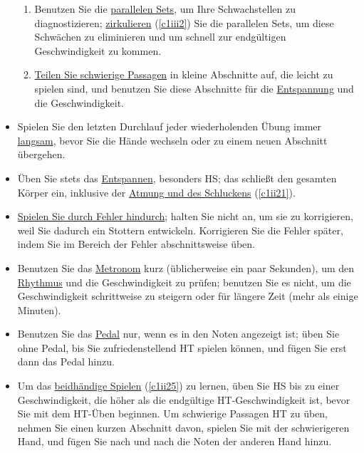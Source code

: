 \begin{itemize}
\begin{enumerate}[label={\alph*.}]
 \item Benutzen Sie die \hyperref[c1ii11]{parallelen Sets}, um Ihre Schwachstellen zu diagnostizieren; \hyperref[c1iii2]{zirkulieren} (\autoref{c1iii2}) Sie die parallelen Sets, um diese Schwächen zu eliminieren und um schnell zur endgültigen Geschwindigkeit zu kommen.
 
 \item \hyperref[c1ii6]{Teilen Sie schwierige Passagen} in kleine Abschnitte auf, die leicht zu spielen sind, und benutzen Sie diese Abschnitte für die \hyperref[c1ii14]{Entspannung} und die Geschwindigkeit.
 \end{enumerate}

\item Spielen Sie den letzten Durchlauf jeder wiederholenden Übung immer \hyperref[c1ii17]{langsam}, bevor Sie die Hände wechseln oder zu einem neuen Abschnitt übergehen.

\item Üben Sie stets das \hyperref[c1ii14]{Entspannen}, besonders HS; das schließt den gesamten Körper ein, inklusive der \hyperref[c1ii21]{Atmung und des Schluckens} (\autoref{c1ii21}).

\item \hyperref[c1ii22]{Spielen Sie durch Fehler hindurch}; halten Sie nicht an, um sie zu korrigieren, weil Sie dadurch ein Stottern entwickeln.
Korrigieren Sie die Fehler später, indem Sie im Bereich der Fehler abschnittsweise üben.

\item Benutzen Sie das \hyperref[c1ii19]{Metronom} kurz (üblicherweise ein paar Sekunden), um den \hyperref[c1iii1b]{Rhythmus} und die Geschwindigkeit zu prüfen; benutzen Sie es nicht, um die Geschwindigkeit schrittweise zu steigern oder für längere Zeit (mehr als einige Minuten).

\item Benutzen Sie das \hyperref[c1ii23]{Pedal} nur, wenn es in den Noten angezeigt ist; üben Sie ohne Pedal, bis Sie zufriedenstellend HT spielen können, und fügen Sie erst dann das Pedal hinzu.

\item Um das \hyperref[c1ii25]{beidhändige Spielen} (\autoref{c1ii25}) zu lernen, üben Sie HS bis zu einer Geschwindigkeit, die höher als die endgültige HT-Geschwindigkeit ist, bevor Sie mit dem HT-Üben beginnen.
Um schwierige Passagen HT zu üben, nehmen Sie einen kurzen Abschnitt davon, spielen Sie mit der schwierigeren Hand, und fügen Sie nach und nach die Noten der anderen Hand hinzu.


\end{itemize}
